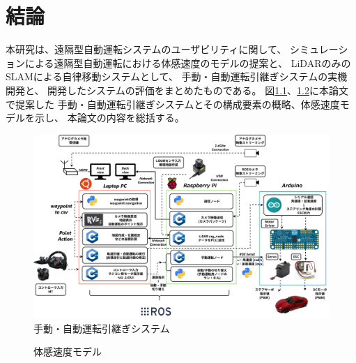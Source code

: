 \chapter{結論}

本研究は、遠隔型自動運転システムのユーザビリティに関して、
シミュレーションによる遠隔型自動運転における体感速度のモデルの提案と、
LiDARのみのSLAMによる自律移動システムとして、
手動・自動運転引継ぎシステムの実機開発と、
開発したシステムの評価をまとめたものである。
図\ref{auto:soukatsu}、\ref{auto:taikan_tokusei_final}に本論文で提案した
手動・自動運転引継ぎシステムとその構成要素の概略、体感速度モデルを示し、
本論文の内容を総括する。

\begin{figure}[h]
  \begin{center}
  \includegraphics[width=\linewidth]{img/auto_2.pdf}
  \caption{手動・自動運転引継ぎシステム}
  \label{auto:soukatsu}
  \end{center}
\end{figure}

\begin{figure}[h]
  \begin{center}
    \caption{体感速度モデル}
    \label{auto:taikan_tokusei_final}
  \end{center}
\end{figure}

